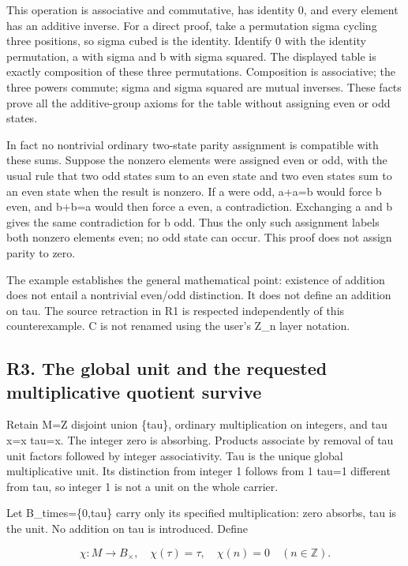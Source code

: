 \documentclass[
]{article}
\begin{document}
This operation is associative and commutative, has identity 0, and every
element has an additive inverse. For a direct proof, take a permutation
sigma cycling three positions, so sigma cubed is the identity. Identify
0 with the identity permutation, a with sigma and b with sigma squared.
The displayed table is exactly composition of these three permutations.
Composition is associative; the three powers commute; sigma and sigma
squared are mutual inverses. These facts prove all the additive-group
axioms for the table without assigning even or odd states.

In fact no nontrivial ordinary two-state parity assignment is compatible
with these sums. Suppose the nonzero elements were assigned even or odd,
with the usual rule that two odd states sum to an even state and two
even states sum to an even state when the result is nonzero. If a were
odd, a+a=b would force b even, and b+b=a would then force a even, a
contradiction. Exchanging a and b gives the same contradiction for b
odd. Thus the only such assignment labels both nonzero elements even; no
odd state can occur. This proof does not assign parity to zero.

The example establishes the general mathematical point: existence of
addition does not entail a nontrivial even/odd distinction. It does not
define an addition on tau. The source retraction in R1 is respected
independently of this counterexample. C is not renamed using the user's
Z\_n layer notation.

\subsection{R3. The global unit and the requested multiplicative
quotient
survive}\label{r3.-the-global-unit-and-the-requested-multiplicative-quotient-survive}

Retain M=Z disjoint union \{tau\}, ordinary multiplication on integers,
and tau x=x tau=x. The integer zero is absorbing. Products associate by
removal of tau unit factors followed by integer associativity. Tau is
the unique global multiplicative unit. Its distinction from integer 1
follows from 1 tau=1 different from tau, so integer 1 is not a unit on
the whole carrier.

Let B\_times=\{0,tau\} carry only its specified multiplication: zero
absorbs, tau is the unit. No addition on tau is introduced. Define

\[
\chi:M\to B_\times,\quad\chi(\tau)=\tau,\quad\chi(n)=0
\quad(n\in\mathbb Z).
\tag{R3.1}
\]
\end{document}
